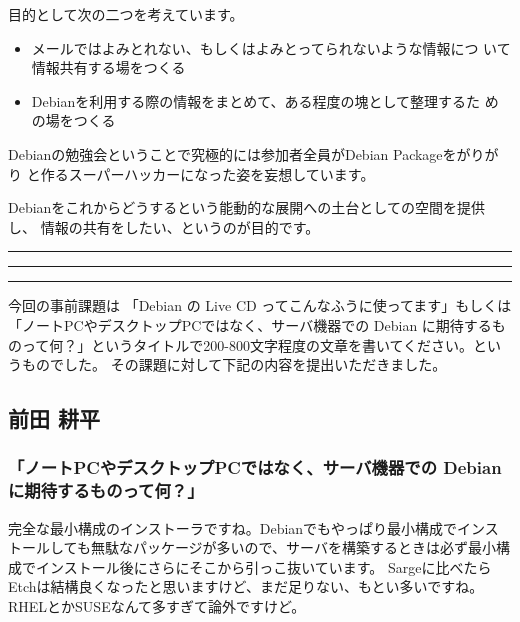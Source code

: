 \documentclass[mingoth,a4paper]{jsarticle}
\begin{document}
 目的として次の二つを考えています。

 \begin{itemize}
 \item メールではよみとれない、もしくはよみとってられないような情報につ
       いて情報共有する場をつくる
 \item Debianを利用する際の情報をまとめて、ある程度の塊として整理するた
       めの場をつくる
 \end{itemize}

 Debianの勉強会ということで究極的には参加者全員がDebian Packageをがりがり
 と作るスーパーハッカーになった姿を妄想しています。

 Debianをこれからどうするという能動的な展開への土台としての空間を提供し、
 情報の共有をしたい、というのが目的です。


\newpage

\begin{minipage}[b]{0.2\hsize}
 \colorbox{dancerlightblue}{}
\end{minipage}
\begin{minipage}[b]{0.8\hsize}
\hrule
\vspace{2mm}
\hrule
\setcounter{tocdepth}{1}
\tableofcontents
\vspace{2mm}
\hrule
\end{minipage}


今回の事前課題は
「Debian の Live CD ってこんなふうに使ってます」もしくは「ノートPCやデスクトップPCではなく、サーバ機器での Debian に期待するものって何？」というタイトルで200-800文字程度の文章を書いてください。というものでした。
その課題に対して下記の内容を提出いただきました。

\subsection{前田 耕平}

\subsubsection{「ノートPCやデスクトップPCではなく、サーバ機器での Debian に期待するものって何？」}
完全な最小構成のインストーラですね。Debianでもやっぱり最小構成でインストールしても無駄なパッケージが多いので、サーバを構築するときは必ず最小構成でインストール後にさらにそこから引っこ抜いています。
Sargeに比べたらEtchは結構良くなったと思いますけど、まだ足りない、もとい多いですね。
RHELとかSUSEなんて多すぎて論外ですけど。
\end{document}
